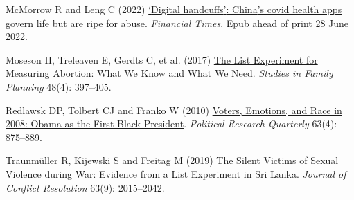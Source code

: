 \documentclass[
  letterpaper,
  DIV=11,
  numbers=noendperiod]{scrartcl}
\newlength{\cslhangindent}
\newlength{\cslentryspacingunit} %
\newenvironment{CSLReferences}[2] %
 {%
  \setlength{\parindent}{0pt}
  \ifodd #1
  \let\oldpar\par
  \def\par{\hangindent=\cslhangindent\oldpar}
  \fi
  \setlength{\parskip}{#2\cslentryspacingunit}
 }%
 {}
\begin{document}
\begin{CSLReferences}{1}{0}
\leavevmode{}%
McMorrow R and Leng C (2022)
\href{https://www.ft.com/content/dee6bcc6-3fc5-4edc-814d-46dc73e67c7e}{{`}Digital
handcuffs{'}: China{'}s covid health apps govern life but are ripe for
abuse}. \emph{Financial Times}. Epub ahead of print 28 June 2022.

\leavevmode{}%
Moseson H, Treleaven E, Gerdts C, et al. (2017)
\href{https://doi.org/10.1111/sifp.12042}{The List Experiment for
Measuring Abortion: What We Know and What We Need}. \emph{Studies in
Family Planning} 48(4): 397--405.

\leavevmode{}%
Redlawsk DP, Tolbert CJ and Franko W (2010)
\href{https://doi.org/10.1177/1065912910373554}{Voters, Emotions, and
Race in 2008: Obama as the First Black President}. \emph{Political
Research Quarterly} 63(4): 875--889.

\leavevmode{}%
Traunmüller R, Kijewski S and Freitag M (2019)
\href{https://doi.org/10.1177/0022002719828053}{The Silent Victims of
Sexual Violence during War: Evidence from a List Experiment in Sri
Lanka}. \emph{Journal of Conflict Resolution} 63(9): 2015--2042.

\end{CSLReferences}
\end{document}
